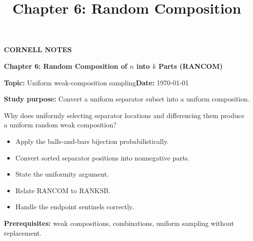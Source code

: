 \documentclass[10pt,letterpaper]{article}
\title{Chapter 6: Random Composition}
\author{}
\date{}
\begin{document}
\maketitle
\begin{tcolorbox}[colback=Paper,colframe=Ink]{\small\bfseries\color{Teal}CORNELL NOTES}\par{\LARGE\bfseries Chapter 6: Random Composition of $n$ into $k$ Parts (RANCOM)}\par\medskip\textbf{Topic:} Uniform weak-composition sampling\hfill\textbf{Date:} \today\par\textbf{Study purpose:} Convert a uniform separator subset into a uniform composition.\end{tcolorbox}
\begin{tcolorbox}[colback=Teal!5,colframe=Teal,title=Essential question]Why does uniformly selecting separator locations and differencing them produce a uniform random weak composition?\end{tcolorbox}
\begin{tcolorbox}[colback=white,colframe=Mist,title=Learning objectives]\begin{itemize}\item Apply the balls-and-bars bijection probabilistically.\item Convert sorted separator positions into nonnegative parts.\item State the uniformity argument.\item Relate RANCOM to RANKSB.\item Handle the endpoint sentinels correctly.\end{itemize}\textbf{Prerequisites:} weak compositions, combinations, uniform sampling without replacement.\end{tcolorbox}
\end{document}

